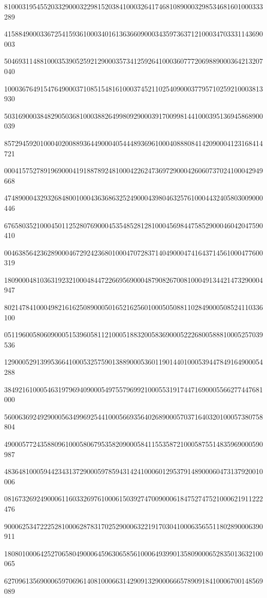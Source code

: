 \documentclass[10pt]{article}
\begin{document}
810003195455203329000322981520384100032641746810890003298534681601000333289\par
415884900033672541593610003401613636609000343597363712100034703331143690003\par
504693114881000353905259212900035734125926410003607772069889000364213207040\par
100036764915476490003710851548161000374521102540900037795710259210003813930\par
503169000384829050368100038826499809290003917009981441000395136945868900039\par
857294592010004020088936449000405444893696100040888084142090004123168414721\par
000415752789196900041918878924810004226247369729000426060737024100042949668\par
474890004329326848001000436368632524900043980463257610004432405803009000446\par
676580352100045011252807690004535485281281000456984475852900046042047590410\par
004638564236289000467292423680100047072837140490004741643714561000477600319\par
180900048103631923210004844722669569000487908267008100049134421473290004947\par
802147841000498216162508900050165216256010005050881102849000508524110336100\par
051196005806090005153960581121000518832005836900052226800588810005257039536\par
129000529139953664100053257590138890005360119014401000539447849164900054288\par
384921610005463197969409000549755796992100055319174471690005566277447681000\par
560063692492900056349969254410005669356402689000570371640320100057380758804\par
490005772435880961000580679535820900058411553587210005875514835969000590987\par
483648100059442343137290005978594314241000601295379148900060473137920010006\par
081673269249000611603326976100061503927470090006184752747521000621911222476\par
900062534722252810006287831702529000632219170304100063565511802890006390911\par
180801000642527065804900064596306585610006493990135809000652835013632100065\par
627096135690006597069614081000663142909132900066657890918410006700148569089\par
\end{document}
